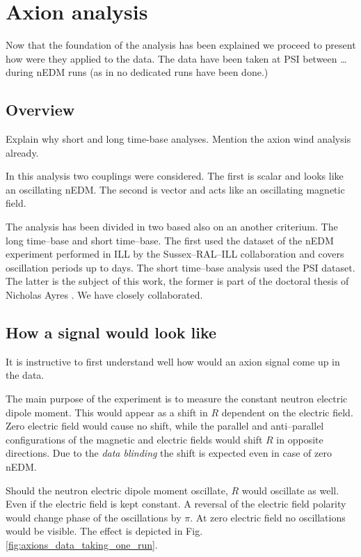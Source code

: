 \chapter{Axion analysis}
\label{ch:nedm-at-psi-apparatus}

Now that the foundation of the analysis has been explained we proceed to present how were they applied to the data. The data have been taken at PSI between \ldots during nEDM runs (as in no dedicated runs have been done.)





\section{Overview}
Explain why short and long time-base analyses. Mention the axion wind analysis already.

In this analysis two couplings were considered. The first  is scalar and looks like an oscillating nEDM. The second is vector and acts like an oscillating magnetic field.

The analysis has been divided in two based also on an another criterium. The long time--base and short time--base. The first used the dataset of the nEDM experiment performed in ILL by the Sussex--RAL--ILL collaboration and covers oscillation periods up to days. The short time--base analysis used the PSI dataset. The latter is the subject of this work, the former is part of the doctoral thesis of Nicholas Ayres . We have closely collaborated.



\section{How a signal would look like}
It is instructive to first understand well how would an axion signal come up in the data.

The main purpose of the experiment is to measure the constant neutron electric dipole moment. This would appear as a shift in $R$ dependent on the electric field. Zero electric field would cause no shift, while the parallel and anti--parallel configurations of the magnetic and electric fields would shift $R$ in opposite directions. Due to the \emph{data blinding} the shift is expected even in case of zero nEDM.

Should the neutron electric dipole moment oscillate, $R$ would oscillate as well. Even if the electric field is kept constant. A reversal of the electric field polarity would change phase of the oscillations by $\pi$. At zero electric field no oscillations would be visible. The effect is depicted in Fig.\,\ref{fig:axions_data_taking_one_run}.

